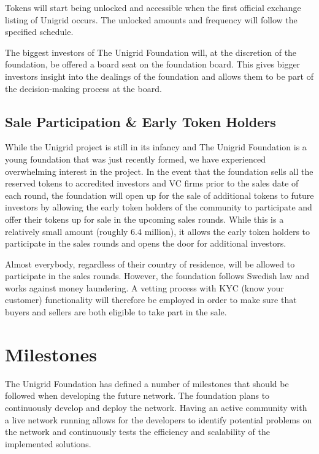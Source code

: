 \documentclass[a4paper,oneside]{article}
\begin{document}
\noindent Tokens will start being unlocked and accessible when the first official exchange listing of Unigrid occurs. The unlocked amounts and frequency will follow the specified schedule.

The biggest investors of The Unigrid Foundation will, at the discretion of the foundation, be offered a board seat on the foundation board. This gives bigger investors insight into the dealings of the foundation and allows them to be part of the decision-making process at the board.

\subsection{Sale Participation \& Early Token Holders}
While the Unigrid project is still in its infancy and The Unigrid Foundation is a young foundation that was just recently formed, we have experienced overwhelming interest in the project. In the event that the foundation sells all the reserved tokens to accredited investors and VC firms prior to the sales date of each round, the foundation will open up for the sale of additional tokens to future investors by allowing the early token holders of the community to participate and offer their tokens up for sale in the upcoming sales rounds. While this is a relatively small amount (roughly 6.4 million), it allows the early token holders to participate in the sales rounds and opens the door for additional investors.

Almost everybody, regardless of their country of residence, will be allowed to participate in the sales rounds. However, the foundation follows Swedish law and works against money laundering. A vetting process with KYC (know your customer) functionality will therefore be employed in order to make sure that buyers and sellers are both eligible to take part in the sale.

\section{Milestones}
The Unigrid Foundation has defined a number of milestones that should be followed when developing the future network. The foundation plans to continuously develop and deploy the network. Having an active community with a live network running allows for the developers to identify potential problems on the network and continuously tests the efficiency and scalability of the implemented solutions.
\end{document}
